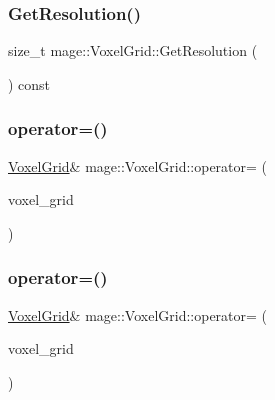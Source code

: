 \hypertarget{classmage_1_1_voxel_grid_aab221660115c414294020da22c3f40e3}{}\label{classmage_1_1_voxel_grid_aab221660115c414294020da22c3f40e3} 
\subsubsection{\texorpdfstring{Get\+Resolution()}{GetResolution()}}
{\footnotesize\ttfamily size\+\_\+t mage\+::\+Voxel\+Grid\+::\+Get\+Resolution (\begin{DoxyParamCaption}{ }\end{DoxyParamCaption}) const\hspace{0.3cm}{\ttfamily [noexcept]}}

\hypertarget{classmage_1_1_voxel_grid_ad8ff79b41ffdee12a3545d98208df40a}{}\label{classmage_1_1_voxel_grid_ad8ff79b41ffdee12a3545d98208df40a} 
\subsubsection{\texorpdfstring{operator=()}{operator=()}\hspace{0.1cm}{\footnotesize\ttfamily [1/2]}}
{\footnotesize\ttfamily \hyperlink{classmage_1_1_voxel_grid}{Voxel\+Grid}\& mage\+::\+Voxel\+Grid\+::operator= (\begin{DoxyParamCaption}\item[{const \hyperlink{classmage_1_1_voxel_grid}{Voxel\+Grid} \&}]{voxel\+\_\+grid }\end{DoxyParamCaption})\hspace{0.3cm}{\ttfamily [delete]}}

\hypertarget{classmage_1_1_voxel_grid_add5f5cbd32fc8279e22f16526a6358d0}{}\label{classmage_1_1_voxel_grid_add5f5cbd32fc8279e22f16526a6358d0} 
\subsubsection{\texorpdfstring{operator=()}{operator=()}\hspace{0.1cm}{\footnotesize\ttfamily [2/2]}}
{\footnotesize\ttfamily \hyperlink{classmage_1_1_voxel_grid}{Voxel\+Grid}\& mage\+::\+Voxel\+Grid\+::operator= (\begin{DoxyParamCaption}\item[{\hyperlink{classmage_1_1_voxel_grid}{Voxel\+Grid} \&\&}]{voxel\+\_\+grid }\end{DoxyParamCaption})\hspace{0.3cm}{\ttfamily [delete]}}

